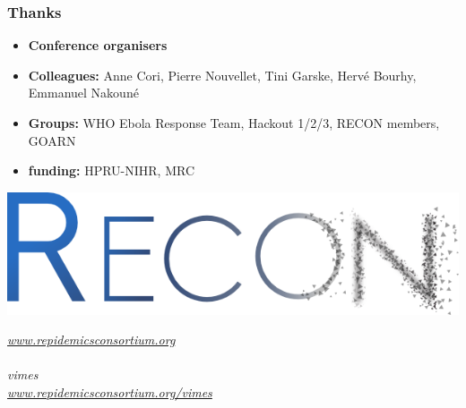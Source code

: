 \documentclass[Xcolor=svgnames,mathserif]{beamer}
\begin{document}
\begin{frame}[fragile]
  \frametitle{Thanks}

    \begin{itemize}
    \item \textbf{Conference organisers}
    \item \textbf{Colleagues:} Anne Cori, Pierre Nouvellet, Tini Garske, Hervé Bourhy, Emmanuel Nakouné
    \item \textbf{Groups:} WHO Ebola Response Team, Hackout 1/2/3, RECON members, GOARN
    \item \textbf{funding:} HPRU-NIHR, MRC
    \end{itemize}

  \begin{center}
    \includegraphics[width=.4\textwidth]{figs/recon-logo}
    
    {\small \emph{\url{www.repidemicsconsortium.org}}}
    ~\\
    ~\\

    {\Large \alert{\emph{vimes}}}\\
    {\small \emph{\url{www.repidemicsconsortium.org/vimes}}}
  \end{center}

\end{frame}
\end{document}
